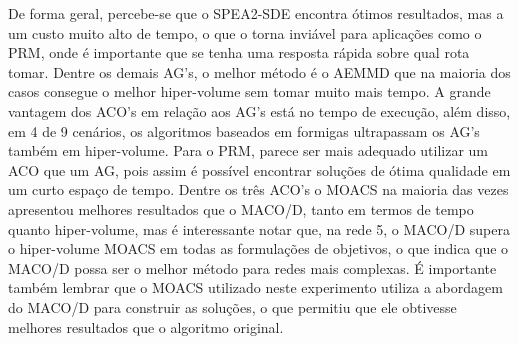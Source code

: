 De forma geral, percebe-se que o SPEA2-SDE encontra ótimos resultados, mas a um custo muito alto de tempo, o que o torna inviável para aplicações como o PRM, onde é importante que se tenha uma resposta rápida sobre qual rota tomar. Dentre os demais AG's, o melhor método é o AEMMD que na maioria dos casos consegue o melhor hiper-volume sem tomar muito mais tempo. A grande vantagem dos ACO's em relação aos AG's está no tempo de execução, além disso, em 4 de 9 cenários, os algoritmos baseados em formigas ultrapassam os AG's também em hiper-volume. Para o PRM, parece ser mais adequado utilizar um ACO que um AG, pois assim é possível encontrar soluções de ótima qualidade em um curto espaço de tempo. Dentre os três ACO's o MOACS na maioria das vezes apresentou melhores resultados que o MACO/D, tanto em termos de tempo quanto hiper-volume, mas é interessante notar que, na rede 5, o MACO/D supera o hiper-volume MOACS em todas as formulações de objetivos, o que indica que o MACO/D possa ser o melhor método para redes mais complexas. É importante também lembrar que o MOACS utilizado neste experimento utiliza a abordagem do MACO/D para construir as soluções, o que permitiu que ele obtivesse melhores resultados que o algoritmo original.